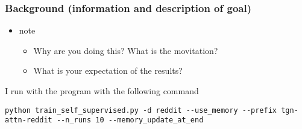 \documentclass[11pt]{article}
\begin{document}
\subsubsection{Background (information and description of goal)}
\label{sec:orgf7c3ffb}
\begin{itemize}
\item note
\begin{itemize}
\item Why are you doing this? What is the movitation?
\item What is your expectation of the results?
\end{itemize}
\end{itemize}

I run with the program with the following command
\begin{verbatim}
python train_self_supervised.py -d reddit --use_memory --prefix tgn-attn-reddit --n_runs 10 --memory_update_at_end
\end{verbatim}
\end{document}
